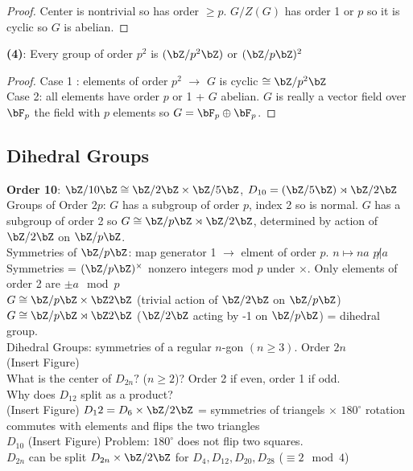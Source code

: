 \begin{proof}
    Center is nontrivial so has order $\ge p$. $G/Z(G)$ has order 1 or $p$ so it is cyclic so $G$ is abelian. 
\end{proof}

\noindent
\textbf{(4)}: Every group of order $p^2$ is $(\bZ/p^2\bZ)$ or $(\bZ/p\bZ)^2$ 

\begin{proof}
    Case 1 : elements of order $p^2$ $\to$ $G$ is cyclic $\cong \bZ/p^2\bZ$ \\
    Case 2: all elements have order $p$ or 1 + $G$ abelian. $G$ is really a vector field over $\bF_p$ the field with $p$ elements so $G = \bF_p \oplus \bF_p$. 
\end{proof}

\subsection{Dihedral Groups} 

\textbf{Order 10}: $\bZ/10\bZ \cong \bZ/2\bZ \times \bZ/5\bZ$, $D_{10} = (\bZ/5\bZ) \rtimes \bZ/2\bZ$ \\

\noindent
Groups of Order $2p$: $G$ has a subgroup of order $p$, index 2 so is normal. $G$ has a subgroup of order 2 so $G \cong \bZ/p\bZ \rtimes \bZ/2\bZ$, determined by action of $\bZ/2\bZ$ on $\bZ/p\bZ$. \\
Symmetries of $\bZ/p\bZ$: map generator 1 $\to$ elment of order $p$. $n \mapsto na$ $p \not| a$ \\
Symmetries  = $(\bZ/p\bZ)^{\times}$ nonzero integers mod $p$ under $\times$. Only elements of order 2 are $\pm a \mod p$ \\
$G \cong \bZ/p\bZ \times \bZ\/2\bZ$ \quad (trivial action of $\bZ/2\bZ$ on $\bZ/p\bZ$) \\
$G \cong \bZ/p\bZ \rtimes \bZ\/2\bZ$ \quad ($\bZ/2\bZ$ acting by -1 on $\bZ/p\bZ$) = dihedral group. \\

\noindent
Dihedral Groups: symmetries of a regular $n$-gon $(n \ge 3)$. Order $2n$ \\
(Insert Figure) \\

\noindent
What is the center of $D_{2n}?$ ($n \ge 2$)? \quad Order 2 if even, order 1 if odd. \\

\noindent
Why does $D_{12}$ split as a product? \\
(Insert Figure) $D_12 = D_6 \times \bZ/2\bZ$ = symmetries of triangels $\times$ $180^{\circ}$ rotation commutes with elements and flips the two triangles \\ 
$D_{10}$ (Insert Figure) Problem: $180^{\circ}$ does not flip two squares. \\
$D_{2n}$ can be split $D_{2n} \times \bZ/2\bZ$ for $D_4, D_{12}, D_{20}, D_{28}$ \quad ($\equiv 2 \mod 4$) \\

